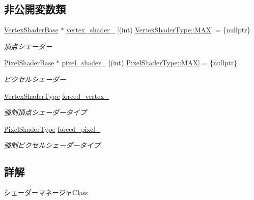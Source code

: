 \subsection*{非公開変数類}
\begin{DoxyCompactItemize}
\item 
\mbox{\hyperlink{class_vertex_shader_base}{Vertex\+Shader\+Base}} $\ast$ \mbox{\hyperlink{class_shader_manager_afdd04862a480ada5dc9f50ec1604e7f5}{vertex\+\_\+shader\+\_\+}} \mbox{[}(int) \mbox{\hyperlink{class_shader_manager_a9b51e49d70eb3cc58f6d1f3994e8cfbda26a4b44a837bf97b972628509912b4a5}{Vertex\+Shader\+Type\+::\+M\+AX}}\mbox{]} = \{nullptr\}
\begin{DoxyCompactList}\small\item\em 頂点シェーダー \end{DoxyCompactList}\item 
\mbox{\hyperlink{class_pixel_shader_base}{Pixel\+Shader\+Base}} $\ast$ \mbox{\hyperlink{class_shader_manager_ad167380b7eed38c3f06e02f2f8eafe00}{pixel\+\_\+shader\+\_\+}} \mbox{[}(int) \mbox{\hyperlink{class_shader_manager_a7d15d773b3c6a99dd7086c45c8b0be5fa26a4b44a837bf97b972628509912b4a5}{Pixel\+Shader\+Type\+::\+M\+AX}}\mbox{]} = \{nullptr\}
\begin{DoxyCompactList}\small\item\em ピクセルシェーダー \end{DoxyCompactList}\item 
\mbox{\hyperlink{class_shader_manager_a9b51e49d70eb3cc58f6d1f3994e8cfbd}{Vertex\+Shader\+Type}} \mbox{\hyperlink{class_shader_manager_ab19a3d8d5ae1099c655d04e5e1218575}{forced\+\_\+vertex\+\_\+}}
\begin{DoxyCompactList}\small\item\em 強制頂点シェーダータイプ \end{DoxyCompactList}\item 
\mbox{\hyperlink{class_shader_manager_a7d15d773b3c6a99dd7086c45c8b0be5f}{Pixel\+Shader\+Type}} \mbox{\hyperlink{class_shader_manager_a36e2deec42b20cc8a5d06987a0a74dc6}{forced\+\_\+pixel\+\_\+}}
\begin{DoxyCompactList}\small\item\em 強制ピクセルシェーダータイプ \end{DoxyCompactList}\end{DoxyCompactItemize}


\subsection{詳解}
シェーダーマネージャ\+Class 


